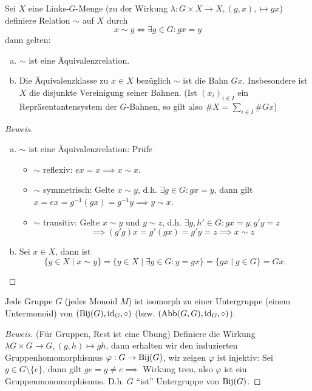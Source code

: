 \documentclass[a4paper]{report}
\begin{document}
\begin{prop}
  Sei $X$ eine Links-$G$-Menge (zu der Wirkung $\lambda: G \times X \to X, (g,x), \mapsto gx$) definiere Relation $\sim$ auf $X$ durch
  $$x \sim y \iff \exists g \in G : gx = y$$
  dann gelten:
  \begin{enumerate}[(a)]
    \item $\sim$ ist eine Äquivalenzrelation.
    \item Die Äquivalenzklasse zu $x \in X$ bezüglich $\sim$ ist die Bahn $Gx$. Insbesondere ist $X$ die disjunkte Vereinigung seiner Bahnen. (Ist $(x_{i})_{i \in I}$ ein Repräsentantensystem der $G$-Bahnen, so gilt also $\#X = \sum_{i \in I}\#Gx$)
  \end{enumerate}
\end{prop}
\begin{proof}[Beweis]
  \begin{enumerate}[(a)]
    \item $\sim$ ist eine Äquivalenzrelation: Prüfe
          \begin{itemize}
          \item $\sim$ reflexiv: $ex = x \implies x \sim x.$
          \item $\sim$ symmetrisch: Gelte $x \sim y$, d.h. $\exists g \in G : gx = y$, dann gilt $x = ex = g^{-1}(gx) = g^{-1}y \implies y \sim x$.
            \item $\sim$ transitiv: Gelte $x \sim y$ und $y \sim z$, d.h. $\exists g, h' \in G : gx = y, g'y = z$
                  $$\implies (g'g)x = g'(gx) = g'y = z \implies x \sim z$$
          \end{itemize}
    \item Sei $x \in X$, dann ist $$\{y \in X \mid x\sim y\} = \{y \in X \mid \exists g \in G : y = gx\} = \{gx \mid g \in G\} = Gx.$$
  \end{enumerate}
\end{proof}

\begin{satz}
Jede Gruppe $G$ (jedes Monoid $M$) ist isomorph zu einer Untergruppe (einem Untermonoid) von $(\operatorname{Bij}(G), \operatorname{id}_{G}, \circ)$ (bzw. $(\operatorname{Abb}(G,G), \operatorname{id}_{G}, \circ)$).
\end{satz}
\begin{proof}[Beweis](Für Gruppen, Rest ist eine Übung) Definiere die Wirkung $\lambda G \times G \to G, (g,h) \mapsto gh$, dann erhalten wir den induzierten Gruppenhomomorphismus $\varphi: G \to \operatorname{Bij}(G)$, wir zeigen $\varphi$ ist injektiv: Sei $g \in G \setminus \{e\}$, dann gilt $ge = g \ne e \implies$ Wirkung treu, also $\varphi$ ist ein Gruppenmonomorphismus. D.h. $G$ ``ist'' Untergruppe von $\operatorname{Bij}(G)$.
\end{proof}
\end{document}
